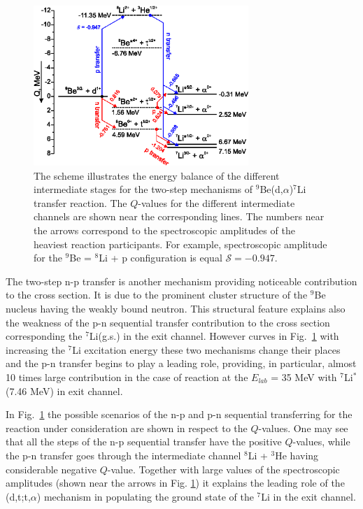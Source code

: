 \documentclass[10pt]{iopart}
\begin{document}
\begin{figure}%
\centering
\includegraphics[width=230pt]{pnvsnp.eps}
\caption{\label{fig:pnvsnp} The scheme illustrates the energy balance of the different intermediate stages for the two-step mechanisms of ${}^9$Be(d,$\alpha$)${}^7$Li transfer reaction. The $Q$-values for the different intermediate channels are shown near the corresponding lines. The numbers near the arrows correspond to the spectroscopic amplitudes of the heaviest reaction participants. For example, spectroscopic amplitude for the ${}^9$Be = ${}^8$Li + p configuration is equal $\mathcal{S} = -0.947$.}
\end{figure}

The two-step n-p transfer is another mechanism providing noticeable contribution to the cross section. It is due to the prominent cluster structure of the ${}^9$Be nucleus having the weakly bound neutron. This structural feature explains also the weakness of the p-n sequential transfer contribution to the cross section corresponding the ${}^7$Li(g.s.) in the exit channel. However curves in Fig.~\ref{fig:pnvsnp} with increasing the ${}^7$Li excitation energy these two mechanisms change their places and the p-n transfer begins to play a leading role, providing, in particular, almost 10 times large contribution in the case of reaction at the $E_{lab}$ = 35 MeV with ${}^7$Li$^*$(7.46 MeV) in exit channel.

In Fig.~\ref{fig:pnvsnp} the possible scenarios of the n-p and p-n sequential transferring for the reaction under consideration are shown in respect to the $Q$-values. One may see that all the steps of the n-p sequential transfer have the positive $Q$-values, while the p-n transfer goes through the intermediate channel ${}^8$Li + ${}^3$He having considerable negative $Q$-value. Together with large values of the spectroscopic amplitudes (shown near the arrows in Fig. \ref{fig:pnvsnp}) it explains the leading role of the (d,t;t,$\alpha$) mechanism in populating the ground state of the ${}^7$Li in the exit channel.
\end{document}

